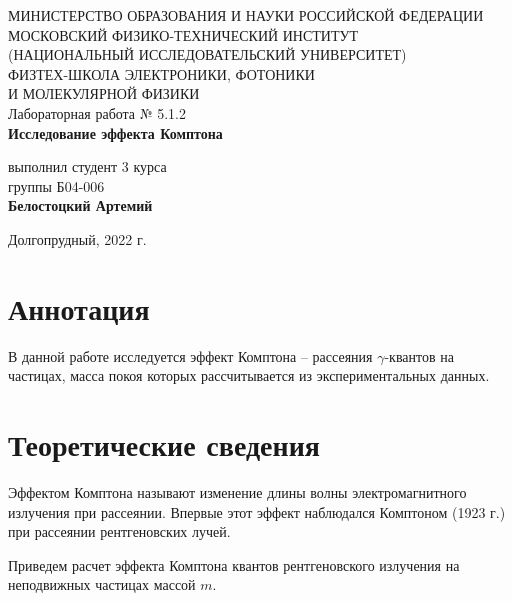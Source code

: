 \documentclass[a4paper,12pt]{article}
\begin{document}
 

\begin{titlepage}
	\begin{center}
		\large 	МИНИСТЕРСТВО ОБРАЗОВАНИЯ И НАУКИ РОССИЙСКОЙ ФЕДЕРАЦИИ\\
				МОСКОВСКИЙ ФИЗИКО-ТЕХНИЧЕСКИЙ ИНСТИТУТ \\
				(НАЦИОНАЛЬНЫЙ ИССЛЕДОВАТЕЛЬСКИЙ УНИВЕРСИТЕТ)\\ 
				ФИЗТЕХ-ШКОЛА ЭЛЕКТРОНИКИ, ФОТОНИКИ \\
				И МОЛЕКУЛЯРНОЙ ФИЗИКИ \\
		
		
		\vspace{4.0 cm}
		Лабораторная работа № 5.1.2 \\ 
		\LARGE \textbf{Исследование эффекта Комптона}
	\end{center}
	\vspace{3 cm} \large
	
	\begin{flushright}
		выполнил студент 3 курса \\
		{группы Б04-006}\\
		\textbf{Белостоцкий Артемий}\\
	\end{flushright}
	
	\vfill

	\begin{center}
	Долгопрудный, 2022 г.
	\end{center}
\end{titlepage}                                                                      

\section*{Аннотация}

В данной работе исследуется эффект Комптона -- рассеяния $\gamma$-квантов на частицах, масса покоя которых рассчитывается из экспериментальных данных.

\section*{Теоретические сведения}

Эффектом Комптона называют изменение длины волны электромагнитного излучения при рассеянии. Впервые этот эффект наблюдался Комптоном (1923 г.) при рассеянии рентгеновских лучей.

Приведем расчет эффекта Комптона квантов рентгеновского излучения на неподвижных частицах массой $m$.
\end{document}
